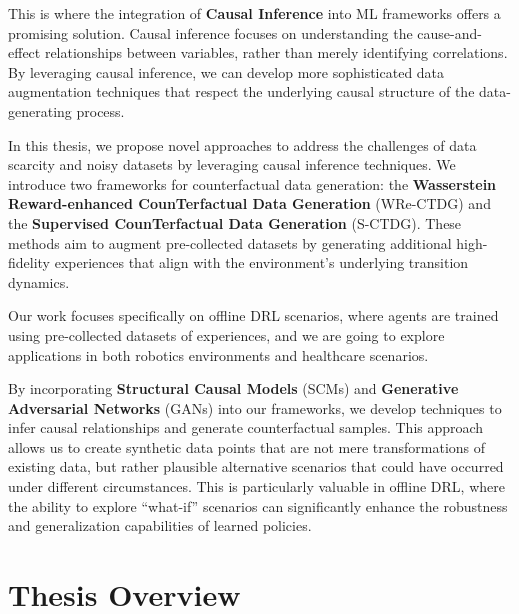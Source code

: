 This is where the integration of \textbf{Causal Inference} into
ML frameworks offers a
promising solution. Causal inference focuses on understanding the
cause-and-effect relationships between variables, rather
than merely identifying correlations. By leveraging causal inference,
we can develop more sophisticated data augmentation techniques that
respect the underlying causal structure of the data-generating process.

In this thesis, we propose novel approaches to address the
challenges of data scarcity and noisy datasets by leveraging
causal inference techniques. We introduce two frameworks for
counterfactual data generation:
the \textbf{Wasserstein Reward-enhanced CounTerfactual Data Generation}
(WRe-CTDG) and the \textbf{Supervised CounTerfactual Data Generation} (S-CTDG).
These methods aim to augment pre-collected datasets by generating additional
high-fidelity experiences that align with the environment's underlying
transition dynamics.

Our work focuses specifically on offline DRL scenarios, where agents
are trained using pre-collected datasets of experiences,
and we are going to explore applications in both robotics environments
and healthcare scenarios.

By incorporating \textbf{Structural Causal Models} (SCMs) and
\textbf{Generative Adversarial Networks} (GANs) into our frameworks,
we develop techniques to infer causal relationships and generate counterfactual
samples. This approach allows us to create synthetic data points
that are not mere transformations of existing data, but rather plausible
alternative scenarios that could have occurred under different circumstances.
This is particularly valuable in offline DRL, where the ability to explore
``what-if'' scenarios can significantly enhance the robustness
and generalization capabilities of learned policies.

\section{Thesis Overview}

